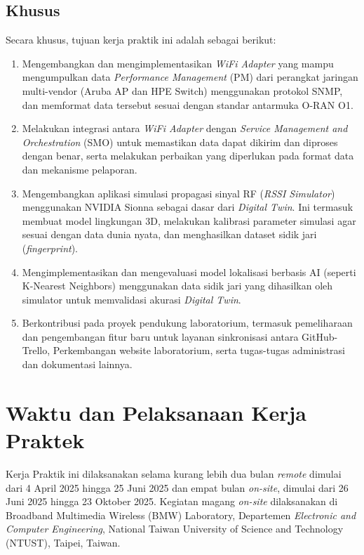 \subsection{Khusus}
Secara khusus, tujuan kerja praktik ini adalah sebagai berikut:
\begin{enumerate}
    \item Mengembangkan dan mengimplementasikan \textit{WiFi Adapter} yang mampu mengumpulkan data \textit{Performance Management} (PM) dari perangkat jaringan multi-vendor (Aruba AP dan HPE Switch) menggunakan protokol SNMP, dan memformat data tersebut sesuai dengan standar antarmuka O-RAN O1.
    \item Melakukan integrasi antara \textit{WiFi Adapter} dengan \textit{Service Management and Orchestration} (SMO) untuk memastikan data dapat dikirim dan diproses dengan benar, serta melakukan perbaikan yang diperlukan pada format data dan mekanisme pelaporan.
    \item Mengembangkan aplikasi simulasi propagasi sinyal RF (\textit{RSSI Simulator}) menggunakan NVIDIA Sionna sebagai dasar dari \textit{Digital Twin}. Ini termasuk membuat model lingkungan 3D, melakukan kalibrasi parameter simulasi agar sesuai dengan data dunia nyata, dan menghasilkan dataset sidik jari (\textit{fingerprint}).
    \item Mengimplementasikan dan mengevaluasi model lokalisasi berbasis AI (seperti K-Nearest Neighbors) menggunakan data sidik jari yang dihasilkan oleh simulator untuk memvalidasi akurasi \textit{Digital Twin}.
    \item Berkontribusi pada proyek pendukung laboratorium, termasuk pemeliharaan dan pengembangan fitur baru untuk layanan sinkronisasi antara GitHub-Trello, Perkembangan website laboratorium, serta tugas-tugas administrasi dan dokumentasi lainnya.
\end{enumerate}

\section{Waktu dan Pelaksanaan Kerja Praktek}
Kerja Praktik ini dilaksanakan selama kurang lebih dua bulan \textit{remote} dimulai dari 4 April 2025 hingga 25 Juni 2025 dan empat bulan \textit{on-site}, dimulai dari 26 Juni 2025 hingga 23 Oktober 2025. Kegiatan magang \textit{on-site} dilaksanakan di Broadband Multimedia Wireless (BMW) Laboratory, Departemen \textit{Electronic and Computer Engineering}, National Taiwan University of Science and Technology (NTUST), Taipei, Taiwan.

